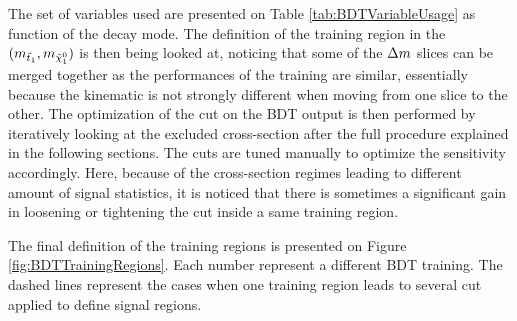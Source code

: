             The set of variables used are presented on Table \ref{tab:BDTVariableUsage} as function of the decay mode. The definition
            of the training region in the $(m_{\tilde{t}_1},m_{\tilde{\chi}_1^0})$ is then being looked at, noticing that some of the
            $\Delta m$ slices can be merged together as the performances of the training are similar, essentially because the kinematic
            is not strongly different when moving from one slice to the other. The optimization of the cut on the BDT output is then
            performed by iteratively looking at the excluded cross-section after the full procedure explained in the following sections.
            The cuts are tuned manually to optimize the sensitivity accordingly. Here, because of the cross-section regimes leading to 
            different amount of signal statistics, it is noticed that there is sometimes a significant gain in loosening or tightening
            the cut inside a same training region.

            The final definition of the training regions is presented on Figure \ref{fig:BDTTrainingRegions}. Each number represent a 
            different BDT training. The dashed lines represent the cases when one training region leads to several cut applied to define
            signal regions.

